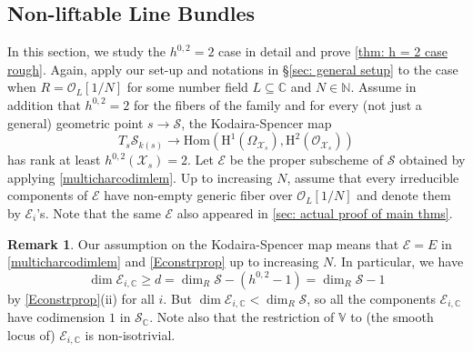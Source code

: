 \documentclass[letter, 11pt]{article}
\theoremstyle{plain}
\theoremstyle{definition}
\newtheorem{remark}[subsubsection]{Remark}
\newcommand{\IC}{\mathbb{C}}
\newcommand{\IN}{\mathbb{N}}
\newcommand{\IV}{\mathbb{V}}
\newcommand{\Hom}{\mathrm{Hom}}
\newcommand{\<}{\langle}
\renewcommand{\>}{\rangle}
\newcommand{\sX}{\mathcal{X}}
\newcommand{\sS}{\mathcal{S}}
\newcommand{\sE}{\mathcal{E}}
\newcommand{\sO}{\mathcal{O}}
\renewcommand{\H}{\mathrm{H}}
\begin{document}
\subsection{Non-liftable Line Bundles}
\label{sec: non-liftable}
In this section, we study the $h^{0, 2} = 2$ case in detail and prove \ref{thm: h = 2 case rough}. Again, apply our set-up and notations in \S\ref{sec: general setup} to the case when $R = \sO_L[1/N]$ for some number field $L \subseteq \IC$ and $N \in \IN$. Assume in addition that $h^{0, 2} = 2$ for the fibers of the family and for every (not just a general) geometric point $s \to \sS$, the Kodaira-Spencer map $$T_s \sS_{k(s)} \to \Hom(\H^1(\Omega_{\sX_s}), \H^2(\sO_{\sX_s}))$$ has rank at least $h^{0, 2}(\sX_s) = 2$. Let $\sE$ be the proper subscheme of $\sS$ obtained by applying \ref{multicharcodimlem}. Up to increasing $N$, assume that every irreducible components of $\sE$ have non-empty generic fiber over $\sO_L[1/N]$ and denote them by $\sE_i$'s. Note that the same $\sE$ also appeared in \ref{sec: actual proof of main thms}. 



\begin{remark}
    \label{rmk: KS on V^2} Our assumption on the Kodaira-Spencer map means that $\sE = E$ in \ref{multicharcodimlem} and \ref{Econstrprop} up to increasing $N$. In particular, we have 
    \[ \dim \sE_{i,\IC} \geq d = \dim_{R} \sS - (h^{0,2} - 1) = \dim_{R} \sS - 1 \]
    by \ref{Econstrprop}(ii) for all $i$. But $\dim \sE_{i,\IC} < \dim_{R} \sS$, so all the components $\sE_{i,\IC}$ have codimension $1$ in $\sS_{\IC}$. Note also that the restriction of $\IV$ to (the smooth locus of) $\sE_{i, \IC}$ is non-isotrivial.
\end{remark}
\end{document}
